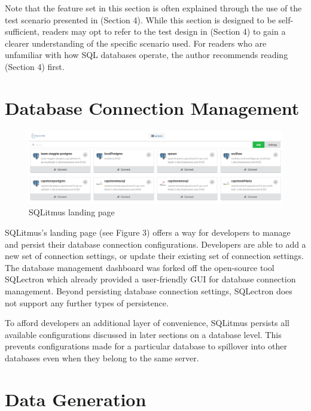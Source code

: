 \documentclass[12pt]{report}
\begin{document}
\begin{spacing}{1.9}
		Note that the feature set in this section is often explained through the use of the test scenario presented in (Section 4). While this section is designed to be self-sufficient, readers may opt to refer to the test design in (Section 4) to gain a clearer understanding of the specific scenario used. For readers who are unfamiliar with how SQL databases operate, the author recommends reading (Section 4) first.
		
		
		\section{Database Connection Management}
		
		
		\begin{figure}[H]
			\centering
			\includegraphics[width=\textwidth]{3-1.png}
			\caption{SQLitmus landing page}
			
		\end{figure}
		
		SQLitmus's landing page (see Figure 3) offers a way for developers to manage and persist their database connection configurations. Developers are able to add a new set of connection settings, or update their existing set of connection settings. The database management dashboard was forked off the open-source tool SQLectron which already provided a user-friendly GUI for database connection management. Beyond persisting database connection settings, SQLectron does not support any further types of persistence.
		
		To afford developers an additional layer of convenience, SQLitmus persists all available configurations discussed in later sections on a database level. This prevents configurations made for a particular database to spillover into other databases even when they belong to the same server.
		
		\section{Data Generation}
		

\end{spacing}
\end{document}
